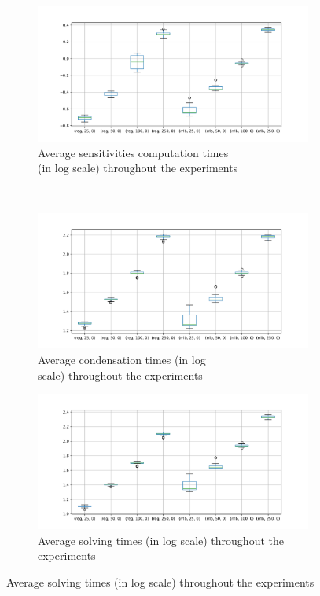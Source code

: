 \documentclass[12pt]{article}
\begin{document}
\begin{itemize}[label=\textbullet]
	\begin{figure}[!ht]
		\centering
		\begin{subfigure}{.5\linewidth}
			\centering
			\includegraphics[width=1.0\textwidth]{images/exp_all_plot_runtimes_1.png}
			\caption{Average sensitivities computation times \\(in log scale) throughout the experiments}
			\label{fig:sensitivity-times}
		\end{subfigure}\,%
		\begin{subfigure}{.5\linewidth}
			\centering
			\includegraphics[width=1.0\textwidth]{images/exp_all_plot_runtimes_2.png}
			\caption{Average condensation times (in log \\ scale) throughout the experiments}
			\label{fig:condensation-times}
		\end{subfigure}\newline
		\begin{subfigure}{.5\linewidth}
			\centering
			\includegraphics[width=1.0\textwidth]{images/exp_all_plot_runtimes_3.png}
			\caption{Average solving times (in log scale) throughout the experiments}
			\label{fig:solving-times}
		\end{subfigure}


\end{figure}
\end{itemize}
\end{document}
